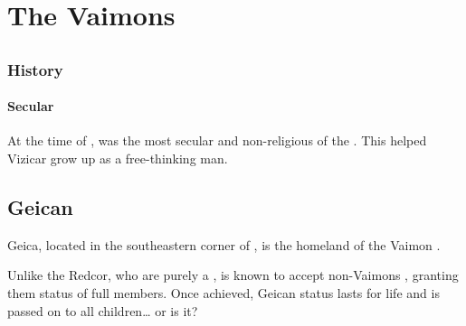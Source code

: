 \chapter{The Vaimons}















\section{\Delaen}
\index{\Delaen}









\subsection{History}





\subsubsection{Secular}
At the time of , \ClanDelaen was the most secular and non-religious of the \VaimonClans.
This helped Vizicar grow up as a free-thinking man. 















\section{Geican}
Geica, located in the southeastern corner of \Velcad{}, is the homeland of the Vaimon \ClanGeican. 

Unlike the Redcor, who are purely a \VaimonClan, \ClanGeican is known to accept non-Vaimons , granting them status of full \vclan members. Once achieved, Geican status lasts for life and is passed on to all children\ldots{} or is it? 

